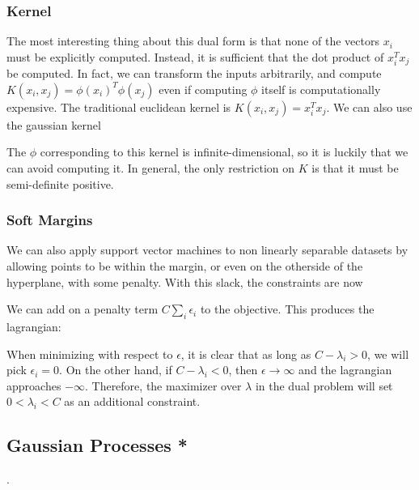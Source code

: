 \documentclass[12pt]{article}
\begin{document}
\subsubsection{Kernel}

The most interesting thing about this dual form is that none of the vectors $x_i$ must be explicitly computed. Instead, it is sufficient that the dot product of $x_i^T x_j$ be computed. In fact, we can transform the inputs arbitrarily, and compute $K(x_i, x_j) = \phi(x_i)^T \phi(x_j)$ even if computing $\phi$ itself is computationally expensive. The traditional euclidean kernel is $K(x_i, x_j) = x_i^Tx_j$. We can also use the gaussian kernel


The $\phi$ corresponding to this kernel is infinite-dimensional, so it is luckily that we can avoid computing it. In general, the only restriction on $K$ is that it must be semi-definite positive.

\subsubsection{Soft Margins}

We can also apply support vector machines to non linearly separable datasets by allowing points to be within the margin, or even on the otherside of the hyperplane, with some penalty. With this slack, the constraints are now


We can add on a penalty term $C\sum_i \epsilon_i$ to the objective. This produces the lagrangian:


When minimizing with respect to $\epsilon$, it is clear that as long as $C-\lambda_i > 0$, we will pick $\epsilon_i = 0$. On the other hand, if $C -\lambda_i < 0$, then $\epsilon \rightarrow \infty$ and the lagrangian approaches $- \infty$. Therefore, the maximizer over $\lambda$ in the dual problem will set $0 < \lambda_i < C$ as an additional constraint.

\subsection{Gaussian Processes *}
.
\end{document}
